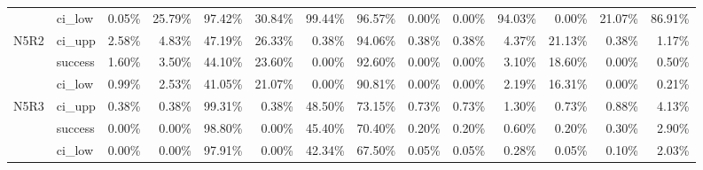 \begin{tabular}{llrrrrrrrrrrrr}
     & ci\_low &       0.05\% & 25.79\% &  97.42\% & 30.84\% &  99.44\% &  96.57\% &        0.00\% &  0.00\% & 94.03\% &  0.00\% & 21.07\% & 86.91\% \\
N5R2 & ci\_upp &       2.58\% &  4.83\% &  47.19\% & 26.33\% &   0.38\% &  94.06\% &        0.38\% &  0.38\% &  4.37\% & 21.13\% &  0.38\% &  1.17\% \\
     & success &       1.60\% &  3.50\% &  44.10\% & 23.60\% &   0.00\% &  92.60\% &        0.00\% &  0.00\% &  3.10\% & 18.60\% &  0.00\% &  0.50\% \\
     & ci\_low &       0.99\% &  2.53\% &  41.05\% & 21.07\% &   0.00\% &  90.81\% &        0.00\% &  0.00\% &  2.19\% & 16.31\% &  0.00\% &  0.21\% \\
N5R3 & ci\_upp &       0.38\% &  0.38\% &  99.31\% &  0.38\% &  48.50\% &  73.15\% &        0.73\% &  0.73\% &  1.30\% &  0.73\% &  0.88\% &  4.13\% \\
     & success &       0.00\% &  0.00\% &  98.80\% &  0.00\% &  45.40\% &  70.40\% &        0.20\% &  0.20\% &  0.60\% &  0.20\% &  0.30\% &  2.90\% \\
     & ci\_low &       0.00\% &  0.00\% &  97.91\% &  0.00\% &  42.34\% &  67.50\% &        0.05\% &  0.05\% &  0.28\% &  0.05\% &  0.10\% &  2.03\% \\
\bottomrule
\end{tabular}

